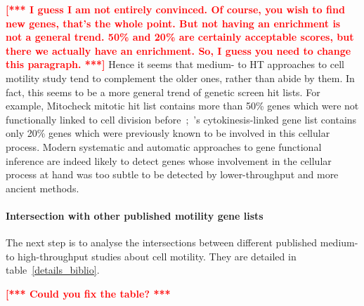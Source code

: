 \textcolor{red}{\bf [*** I guess I am not entirely convinced. Of
  course, you wish to find new genes, that's the whole point. But not
  having an enrichment is not a general trend. 50\% and 20\% are
  certainly acceptable scores, but there we actually have an
  enrichment. So, I guess you need to change this paragraph. ***]}
Hence it seems that medium- to HT approaches to cell motility study
tend to complement the older ones, rather than abide by them. 
In fact, this seems to be a more general trend of genetic screen hit lists. For
example, Mitocheck mitotic hit list contains more than 50\% genes
which were not functionally linked to cell division
before~\cite{pmid20360735};~\cite{pmid15547975}'s cytokinesis-linked
gene list contains only 20\% genes which were previously known to be
involved in this cellular process. Modern systematic and automatic
approaches to gene functional inference are indeed likely to detect
genes whose involvement in the cellular process at hand was too subtle
to be detected by lower-throughput and more ancient methods. 

%
%

\paragraph{Intersection with other published motility gene lists }The
next step is to analyse the intersections between different published
medium- to high-throughput studies 
about cell motility. They are detailed in table~\ref{details_biblio}. 

\textcolor{red}{\bf [*** Could you fix the table? ***}

